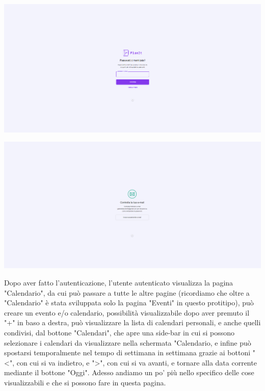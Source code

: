 \begin{center}
    \includegraphics[width=1\textwidth, height=0.3\textheight]{img/png/FrontEnd/Homepage_Autenticazione/recupero_password.png}
\end{center}

\begin{center}
    \includegraphics[width=1\textwidth, height=0.3\textheight]{img/png/FrontEnd/Homepage_Autenticazione/controlla_email.png}
\end{center}

Dopo aver fatto l'autenticazione, l'utente autenticato visualizza la pagina "Calendario", da cui può passare a tutte le altre pagine (ricordiamo che oltre a "Calendario" è stata sviluppata solo la pagina "Eventi" in questo protitipo), può creare un evento  e/o calendario, possibilità visualizzabile dopo aver premuto il "+" in baso a destra, può visualizzare la lista di calendari personali, e anche quelli condivisi, dal bottone "Calendari", che apre una side-bar in cui si possono selezionare i calendari da visualizzare nella schermata "Calendario, e infine può spostarsi temporalmente nel tempo di settimana in settimana grazie ai bottoni "<", con cui si va indietro, e ">", con cui si va avanti, e tornare alla data corrente mediante il bottone "Oggi". Adesso andiamo un po' più nello specifico delle cose visualizzabili e che si possono fare in questa pagina.

